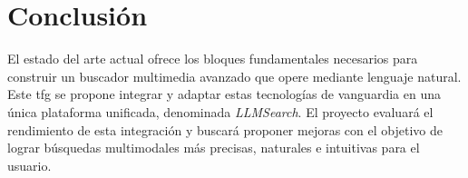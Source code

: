 \begin{table}[h!]
  \centering
  \captionsetup{justification=centering} %
  \caption{Comparativa de modelos representativos en lenguaje y multimodalidad.}
  \label{tab:comparativa_modelos}
\end{table}

\section{Conclusión}
\label{sec:conclusion}

El estado del arte actual ofrece los bloques fundamentales necesarios para construir un buscador multimedia avanzado que opere mediante lenguaje natural. Este \gls{tfg} se propone integrar y adaptar estas tecnologías de vanguardia en una única plataforma unificada, denominada \emph{LLMSearch}. El proyecto evaluará el rendimiento de esta integración y buscará proponer mejoras con el objetivo de lograr búsquedas multimodales más precisas, naturales e intuitivas para el usuario.